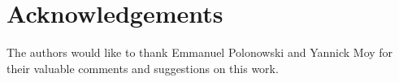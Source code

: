 \section*{Acknowledgements}
The authors would like to thank Emmanuel Polonowski and Yannick Moy for their valuable comments and 
suggestions on this work.

